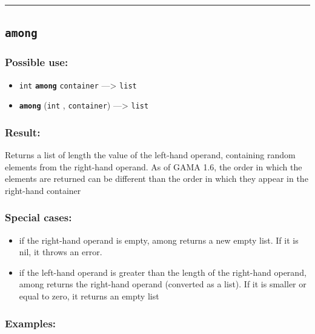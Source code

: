 \documentclass[]{book}
\providecommand{\tightlist}{%
  \setlength{\itemsep}{0pt}\setlength{\parskip}{0pt}}
\theoremstyle{definition}
\theoremstyle{definition}
\theoremstyle{definition}
\theoremstyle{remark}
\begin{document}
\begin{center}\rule{0.5\linewidth}{\linethickness}\end{center}

\subsection{\texorpdfstring{\texttt{among}}{among}}\label{among}

\subsubsection{Possible use:}\label{possible-use-34}

\begin{itemize}
\tightlist
\item
  \texttt{int} \textbf{\texttt{among}} \texttt{container}
  ---\textgreater{} \texttt{list}
\item
  \textbf{\texttt{among}} (\texttt{int} , \texttt{container})
  ---\textgreater{} \texttt{list}
\end{itemize}

\subsubsection{Result:}\label{result-33}

Returns a list of length the value of the left-hand operand, containing
random elements from the right-hand operand. As of GAMA 1.6, the order
in which the elements are returned can be different than the order in
which they appear in the right-hand container

\subsubsection{Special cases:}\label{special-cases-15}

\begin{itemize}
\tightlist
\item
  if the right-hand operand is empty, among returns a new empty list. If
  it is nil, it throws an error.\\
\item
  if the left-hand operand is greater than the length of the right-hand
  operand, among returns the right-hand operand (converted as a list).
  If it is smaller or equal to zero, it returns an empty list
\end{itemize}

\subsubsection{Examples:}\label{examples-27}
\end{document}
